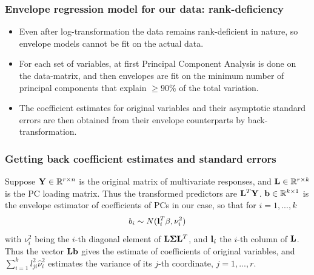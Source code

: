 \documentclass[handout,10pt]{beamer}
\begin{document}
\begin{frame}
\frametitle{Envelope regression model for our data: rank-deficiency}
\begin{itemize}
\item Even after log-transformation the data remains rank-deficient in nature, so envelope models cannot be fit on the actual data.
\vspace{.2cm}
\item For each set of variables, at first Principal Component Analysis is done on the data-matrix, and then envelopes are fit on the minimum number of principal components that explain $\geq 90\%$ of the total variation.
\vspace{.2cm}
\item The coefficient estimates for original variables and their asymptotic standard errors are then obtained from their envelope counterparts by back-transformation.
\end{itemize}
\end{frame}

\begin{frame}
\frametitle{Getting back coefficient estimates and standard errors}
Suppose ${\mathbf{Y}}\in{\mathbb{R}}^{r\times n}$ is the original matrix of multivariate responses, and ${\mathbf{L}}\in{\mathbb{R}}^{r\times k}$ is the PC loading matrix. Thus the transformed predictors are ${\mathbf{L}}^T{\mathbf{Y}}$. ${\bf{b}}\in{\mathbb{R}}^{k \times 1}$ is the envelope estimator of coefficients of PCs in our case, so that for $i=1,...,k$
$$ b_i \sim N({\bf{l}}^T_i\beta,\nu^2_i) $$
with $\nu^2_i$ being the $i$-th diagonal element of ${\mathbf{L}}{\boldsymbol{\Sigma}}{\mathbf{L}}^T$, and ${\bf{l}}_i$ the $i$-th column of ${\mathbf{L}}$.\\
\vspace{.5cm}
Thus the vector ${\mathbf{L}}{\bf{b}}$ gives the estimate of coefficients of original variables, and $\sum_{i=1}^k l_{ji}^2\hat\nu_i^2$ estimates the variance of its $j$-th coordinate, $j = 1,...,r$.
\end{frame}
\end{document}
